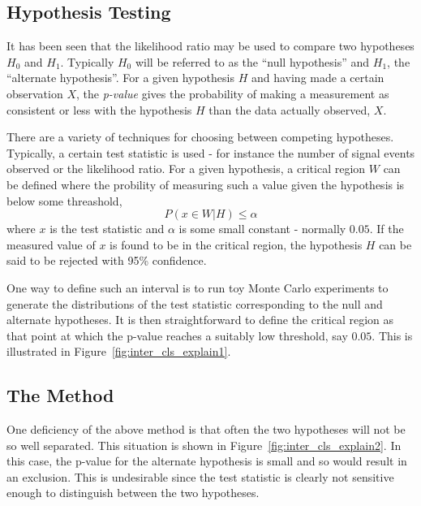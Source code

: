 \subsection{Hypothesis Testing}
\label{sec:inter_cls}
It has been seen that the likelihood ratio may be used to compare two hypotheses
$H_0$ and $H_1$. Typically $H_0$ will be referred to as the ``null hypothesis''
and $H_1$, the ``alternate hypothesis''. For a given hypothesis $H$ and having
made a certain observation $X$, the \emph{p-value} gives the probability of
making a measurement as consistent or less with the hypothesis $H$ than the data
actually observed, $X$.

There are a variety of techniques for choosing between competing
hypotheses. Typically, a certain test statistic is used - for instance the
number of signal events observed or the likelihood ratio. For a given
hypothesis, a critical region $W$ can be defined where the probility of measuring
such a value given the hypothesis is below some threashold,
\begin{equation*}
P\left(x \in W|H\right) \leq \alpha
\end{equation*}
where $x$ is the test statistic and $\alpha$ is some small constant - normally
$0.05$. If the measured value of $x$ is found to be in the critical region, the
hypothesis $H$ can be said to be rejected with 95\% confidence.

One way to define such an interval is to run toy Monte Carlo experiments to
generate the distributions of the test statistic corresponding to the null and
alternate hypotheses. It is then straightforward to define the critical region
as that point at which the p-value reaches a suitably low threshold, say
$0.05$. This is illustrated in Figure~\ref{fig:inter_cls_explain1}.

\begin{figure}
\centering
{}
\caption[]{}
\label{fig:inter_cls_explain}
\end{figure}

\subsection{The \CLs Method}
One deficiency of the above method is that often the two hypotheses will not be
so well separated. This situation is shown in
Figure~\ref{fig:inter_cls_explain2}. In this case, the p-value for the alternate
hypothesis is small and so would result in an exclusion. This is undesirable
since the test statistic is clearly not sensitive enough to distinguish between
the two hypotheses.

